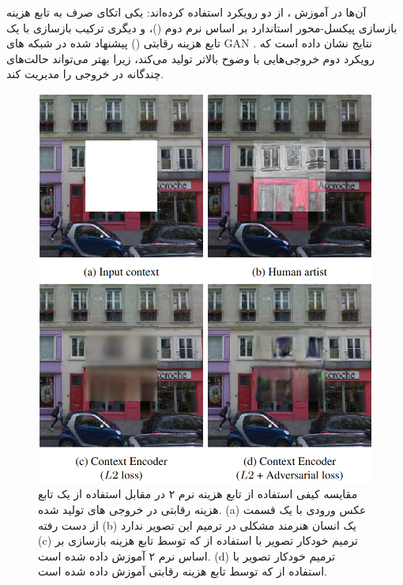 آن‌ها در آموزش ،‌ از دو رویکرد استفاده کرده‌اند: یکی اتکای صرف به تابع هزینه بازسازی پیکسل-محور استاندارد بر اساس نرم دوم ()، و دیگری ترکیب بازسازی با یک تابع هزینه رقابتی () پیشنهاد شده در شبکه های GAN
\cite{goodfellowGenerativeAdversarialNetworks2014}.
نتایج نشان داده است که رویکرد دوم خروجی‌هایی با وضوح بالاتر تولید می‌کند، زیرا بهتر می‌تواند حالت‌های چندگانه در خروجی را مدیریت کند.  

\begin{figure}
	\centering
	\includegraphics[width=0.7\linewidth]{figs/contextencodersLossComparison}
	\caption{مقایسه کیفی  استفاده از تابع هزینه نرم  ۲ در مقابل استفاده از یک تابع هزینه رقابتی در خروجی های تولید شده. 
		(a) عکس ورودی با یک قسمت از دست رفته 
		(b) یک انسان هنرمند مشکلی در ترمیم این تصویر ندارد 
		(c)
ترمیم خودکار تصویر با استفاده از  که توسط تابع هزینه بازسازی بر اساس نرم ۲ آموزش داده شده است.
	(d)
ترمیم خودکار تصویر با استفاده از  که توسط تابع هزینه رقابتی آموزش داده شده است.
}
	\label{fig:contextencoderslosscomparison}
\end{figure}




